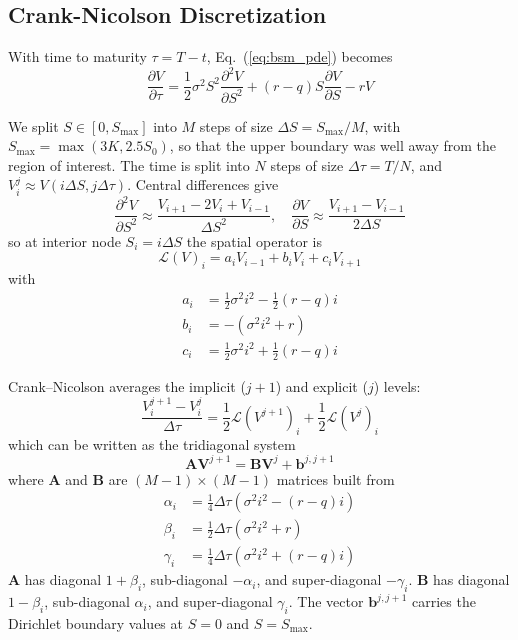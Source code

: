 \documentclass[10pt,journal,compsoc]{IEEEtran}
\begin{document}
\subsection{Crank-Nicolson Discretization}
With time to maturity $\tau = T - t$, Eq.~(\ref{eq:bsm_pde}) becomes
\begin{equation}
\frac{\partial V}{\partial \tau} = \frac{1}{2}\sigma^2 S^2 \frac{\partial^2 V}{\partial S^2} + (r - q) S \frac{\partial V}{\partial S} - r V
\end{equation}

We split $S \in [0, S_{\max}]$ into $M$ steps of size $\Delta S = S_{\max} / M$, with $S_{\max} = \max(3K, 2.5 S_0)$, so that the upper boundary was well away from the region of interest. The time is split into $N$ steps of size $\Delta \tau = T / N$, and $V_i^j \approx V(i \Delta S, j \Delta \tau)$. Central differences give
\begin{equation}
\frac{\partial^2 V}{\partial S^2} \approx \frac{V_{i+1} - 2V_i + V_{i-1}}{\Delta S^2}, \quad \frac{\partial V}{\partial S} \approx \frac{V_{i+1} - V_{i-1}}{2\Delta S}
\end{equation}
so at interior node $S_i = i \Delta S$ the spatial operator is
\begin{equation}
\mathcal{L}(V)_i = a_i V_{i-1} + b_i V_i + c_i V_{i+1}
\end{equation}
with
\begin{align}
a_i &= \frac{1}{2}\sigma^2 i^2 - \frac{1}{2}(r - q) i \\
b_i &= -(\sigma^2 i^2 + r) \\
c_i &= \frac{1}{2}\sigma^2 i^2 + \frac{1}{2}(r - q) i
\end{align}

Crank--Nicolson averages the implicit ($j+1$) and explicit ($j$) levels:
\begin{equation}
\frac{V_i^{j+1} - V_i^j}{\Delta \tau} = \frac{1}{2}\mathcal{L}(V^{j+1})_i + \frac{1}{2}\mathcal{L}(V^j)_i
\end{equation}
which can be written as the tridiagonal system
\begin{equation}
\mathbf{A} \mathbf{V}^{j+1} = \mathbf{B} \mathbf{V}^j + \mathbf{b}^{j, j+1}
\label{eq:matrix_system}
\end{equation}
where $\mathbf{A}$ and $\mathbf{B}$ are $(M-1) \times (M-1)$ matrices built from
\begin{align}
\alpha_i &= \frac{1}{4} \Delta \tau \left(\sigma^2 i^2 - (r - q) i\right) \\
\beta_i &= \frac{1}{2} \Delta \tau \left(\sigma^2 i^2 + r\right) \\
\gamma_i &= \frac{1}{4} \Delta \tau \left(\sigma^2 i^2 + (r - q) i\right)
\end{align}
$\mathbf{A}$ has diagonal $1 + \beta_i$, sub-diagonal $-\alpha_i$, and super-diagonal $-\gamma_i$. $\mathbf{B}$ has diagonal $1 - \beta_i$, sub-diagonal $\alpha_i$, and super-diagonal $\gamma_i$. The vector $\mathbf{b}^{j,j+1}$ carries the Dirichlet boundary values at $S = 0$ and $S = S_{\max}$.
\end{document}
